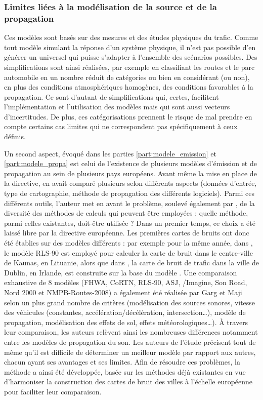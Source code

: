 \subsubsection{Limites liées à la modélisation de la source et de la propagation}

Ces modèles sont basés sur des mesures et des études physiques du trafic. Comme tout modèle simulant la réponse d'un système physique, il n'est pas possible d'en générer un universel qui puisse s'adapter à l'ensemble des scénarios possibles. Des simplifications sont ainsi réalisées, par exemple en classifiant les routes et le parc automobile en un nombre réduit de catégories ou bien en considérant (ou non), en plus des conditions atmosphériques homogènes, des conditions favorables à la propagation. Ce sont d'autant de simplifications qui, certes, facilitent l'implémentation et l'utilisation des modèles mais qui sont aussi vecteurs d'incertitudes. De plus, ces catégorisations prennent le risque de mal prendre en compte certains cas limites qui ne correspondent pas spécifiquement à ceux définis.

Un second aspect, évoqué dans les parties \ref{part:modele_emission} et \ref{part:modele_propa} est celui de l'existence de plusieurs modèles d'émission et de propagation au sein de plusieurs pays européens. Avant même la mise en place de la directive, \cite{steele_critical_2001} en avait comparé plusieurs selon différents aspects (données d'entrée, type de cartographie, méthode de propagation des différents logiciels).
Parmi ces différents outils, l'auteur met en avant le problème, soulevé également par \cite{king_implementation_2011}, de la diversité des méthodes de calculs qui peuvent être employées : quelle méthode, parmi celles existantes, doit-être utilisée ?
Dans un premier temps, ce choix a été laissé libre par la directive européenne. Les premières cartes de bruits ont donc été établies sur des modèles différents : par exemple pour la même année, dans \cite{kliuvcininkas2006noise}, le modèle RLS-90 est employé pour calculer la carte de bruit dans le centre-ville de Kaunas, en Lituanie,  alors que dans \cite{murphy_environmental_2006}, la carte de bruit de trafic dans la ville de Dublin, en Irlande, est construite sur la base du modèle .
Une comparaison exhaustive de 8 modèles (FHWA, CoRTN, RLS-90, ASJ, /Imagine, Son Road, Nord 2000 et NMPB-Routes-2008) a également été réalisée par Garg et Maji \cite{garg_critical_2014} selon un plus grand nombre de critères (modélisation des sources sonores, vitesse des véhicules (constantes, accélération/décélération, intersection\dots), modèle de propagation, modélisation des effets de sol, effets météorologiques\dots). À travers leur comparaison, les auteurs relèvent ainsi les nombreuses différences notamment entre les modèles de propagation du son. Les auteurs de l'étude précisent tout de même qu'il est difficile de déterminer un \og meilleur \fg{} modèle par rapport aux autres, chacun ayant ses avantages et ses limites.
Afin de résoudre ces problèmes, la méthode  \cite{CNOSSOS,kephalopoulos} a ainsi été développée, basée sur les méthodes déjà existantes en vue d'harmoniser la construction des cartes de bruit des villes à l'échelle européenne pour faciliter leur comparaison.

